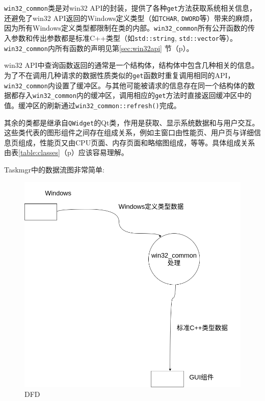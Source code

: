 \documentclass{beamer}
\newcommand\code[1]{\texttt{#1}}
\newcommand\myref[1]{\ref{#1}（p\pageref{#1}）}
\begin{document}
\begin{frame}
\code{win32\_common}类是对win32 API的封装，提供了各种\code{get}方法获取系统相关信息，还避免了win32 API返回的Windows定义类型（如\code{TCHAR}, \code{DWORD}等）带来的麻烦，因为所有Windows定义类型都限制在类的内部。\code{win32\_common}所有公开函数的传入参数和传出参数都是标准C++类型（如\code{std::string}, \code{std::vector}等）。\code{win32\_common}内所有函数的声明见第\ref{sec:win32api} 节（p\pageref{sec:win32api}）。
\end{frame}

\begin{frame}
win32 API中查询函数返回的通常是一个结构体，结构体中包含几种相关的信息。为了不在调用几种请求的数据性质类似的\code{get}函数时重复调用相同的API，\code{win32\_common}内设置了缓冲区。与其他可能被请求的信息存在同一个结构体的数据都存入\code{win32\_common}内的缓冲区，调用相应的\code{get}方法时直接返回缓冲区中的值。缓冲区的刷新通过\code{win32\_common::refresh()}完成。
\end{frame}

\begin{frame}
其余的类都是继承自\code{QWidget}的Qt类，作用是获取、显示系统数据和与用户交互。这些类代表的图形组件之间存在组成关系，例如主窗口由性能页、用户页与详细信息页组成，性能页又由CPU页面、内存页面和略缩图组成，等等。具体组成关系由表\myref{table:classes}应该容易理解。
\end{frame}

\begin{frame}
    Taskmgr中的数据流图非常简单:
\begin{figure}
    \centering
    \includegraphics[scale=0.23]{../dia/DFD.png}
    \caption{DFD}
    \label{d}
\end{figure}
\end{frame}
\end{document}
